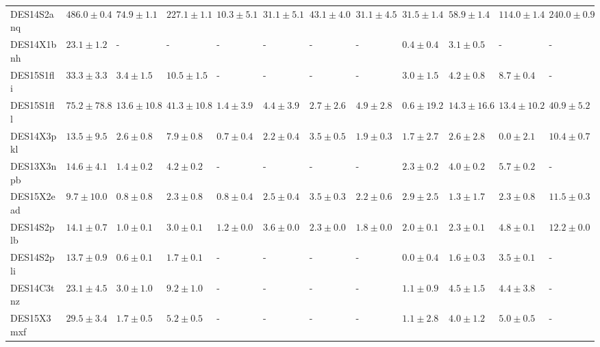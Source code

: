 \documentclass[fleqn,usenatbib,]{mnras}
\begin{document}
\begin{table}
\begin{tabular}{llllllllllll}
DES14S2anq &  $486.0 \pm 0.4$ &   $74.9 \pm 1.1$ &   $227.1 \pm 1.1$ &  $10.3 \pm 5.1$ &  $31.1 \pm 5.1$ &  $43.1 \pm 4.0$ &  $31.1 \pm 4.5$ &  $31.5 \pm 1.4$ &   $58.9 \pm 1.4$ &  $114.0 \pm 1.4$ &  $240.0 \pm 0.9$ \\
DES14X1bnh &   $23.1 \pm 1.2$ &                - &                 - &               - &               - &               - &               - &   $0.4 \pm 0.4$ &    $3.1 \pm 0.5$ &                - &                - \\
DES15S1fli &   $33.3 \pm 3.3$ &    $3.4 \pm 1.5$ &    $10.5 \pm 1.5$ &               - &               - &               - &               - &   $3.0 \pm 1.5$ &    $4.2 \pm 0.8$ &    $8.7 \pm 0.4$ &                - \\
DES15S1fll &  $75.2 \pm 78.8$ &  $13.6 \pm 10.8$ &   $41.3 \pm 10.8$ &   $1.4 \pm 3.9$ &   $4.4 \pm 3.9$ &   $2.7 \pm 2.6$ &   $4.9 \pm 2.8$ &  $0.6 \pm 19.2$ &  $14.3 \pm 16.6$ &  $13.4 \pm 10.2$ &   $40.9 \pm 5.2$ \\
DES14X3pkl &   $13.5 \pm 9.5$ &    $2.6 \pm 0.8$ &     $7.9 \pm 0.8$ &   $0.7 \pm 0.4$ &   $2.2 \pm 0.4$ &   $3.5 \pm 0.5$ &   $1.9 \pm 0.3$ &   $1.7 \pm 2.7$ &    $2.6 \pm 2.8$ &    $0.0 \pm 2.1$ &   $10.4 \pm 0.7$ \\
DES13X3npb &   $14.6 \pm 4.1$ &    $1.4 \pm 0.2$ &     $4.2 \pm 0.2$ &               - &               - &               - &               - &   $2.3 \pm 0.2$ &    $4.0 \pm 0.2$ &    $5.7 \pm 0.2$ &                - \\
DES15X2ead &   $9.7 \pm 10.0$ &    $0.8 \pm 0.8$ &     $2.3 \pm 0.8$ &   $0.8 \pm 0.4$ &   $2.5 \pm 0.4$ &   $3.5 \pm 0.3$ &   $2.2 \pm 0.6$ &   $2.9 \pm 2.5$ &    $1.3 \pm 1.7$ &    $2.3 \pm 0.8$ &   $11.5 \pm 0.3$ \\
DES14S2plb &   $14.1 \pm 0.7$ &    $1.0 \pm 0.1$ &     $3.0 \pm 0.1$ &   $1.2 \pm 0.0$ &   $3.6 \pm 0.0$ &   $2.3 \pm 0.0$ &   $1.8 \pm 0.0$ &   $2.0 \pm 0.1$ &    $2.3 \pm 0.1$ &    $4.8 \pm 0.1$ &   $12.2 \pm 0.0$ \\
DES14S2pli &   $13.7 \pm 0.9$ &    $0.6 \pm 0.1$ &     $1.7 \pm 0.1$ &               - &               - &               - &               - &   $0.0 \pm 0.4$ &    $1.6 \pm 0.3$ &    $3.5 \pm 0.1$ &                - \\
DES14C3tnz &   $23.1 \pm 4.5$ &    $3.0 \pm 1.0$ &     $9.2 \pm 1.0$ &               - &               - &               - &               - &   $1.1 \pm 0.9$ &    $4.5 \pm 1.5$ &    $4.4 \pm 3.8$ &                - \\
DES15X3mxf &   $29.5 \pm 3.4$ &    $1.7 \pm 0.5$ &     $5.2 \pm 0.5$ &               - &               - &               - &               - &   $1.1 \pm 2.8$ &    $4.0 \pm 1.2$ &    $5.0 \pm 0.5$ &                - \\

\end{tabular}
\end{table}
\end{document}
